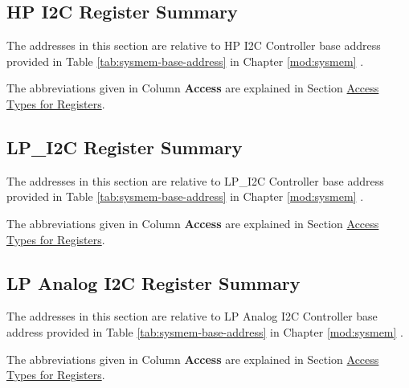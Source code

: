 \documentclass[main\_\_EN.tex]{subfiles}
\begin{document}
\subsection{HP I2C Register Summary}
\label{sec:i2c-ext-reg-summ}
\hypertarget{i2c-ext-reg-summ}{}

The addresses in this section are relative to HP I2C Controller base address provided in Table \ref{tab:sysmem-base-address} in Chapter \ref{mod:sysmem} \textit{}.

The abbreviations given in Column \textbf{Access} are explained in Section \hyperref[glossary-access-types]{Access Types for Registers}.




\subsection{LP\_I2C Register Summary}
\label{sec:lp-i2c-ext-reg-summ}
\hypertarget{lp-i2c-ext-reg-summ}{}

The addresses in this section are relative to LP\_I2C Controller base address provided in Table \ref{tab:sysmem-base-address} in Chapter \ref{mod:sysmem} \textit{}.

The abbreviations given in Column \textbf{Access} are explained in Section \hyperref[glossary-access-types]{Access Types for Registers}.




\subsection{LP Analog I2C Register Summary}
\label{sec:lp-i2c-ana-reg-summ}
\hypertarget{lp-i2c-ana-reg-summ}{}

The addresses in this section are relative to LP Analog I2C Controller base address provided in Table \ref{tab:sysmem-base-address} in Chapter \ref{mod:sysmem} \textit{}.

The abbreviations given in Column \textbf{Access} are explained in Section \hyperref[glossary-access-types]{Access Types for Registers}.




\end{document}

